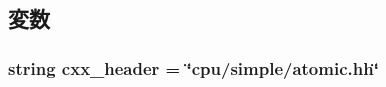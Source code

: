 \subsection{変数}
\hypertarget{classAtomicSimpleCPU_1_1AtomicSimpleCPU_a17da7064bc5c518791f0c891eff05fda}{
\subsubsection[{cxx\_\-header}]{\setlength{\rightskip}{0pt plus 5cm}string {\bf cxx\_\-header} = \char`\"{}cpu/simple/atomic.hh\char`\"{}}}
\label{classAtomicSimpleCPU_1_1AtomicSimpleCPU_a17da7064bc5c518791f0c891eff05fda}


